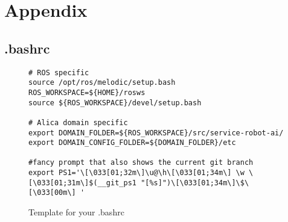 \appendix
\chapter{Appendix}
\label{chap:Appendix}

\begin{landscape}
  \section{.bashrc}
  \label{sec:bashrc}
  \begin{figure}[htbp]
    \begin{verbatim}
# ROS specific 
source /opt/ros/melodic/setup.bash
ROS_WORKSPACE=${HOME}/rosws
source ${ROS_WORKSPACE}/devel/setup.bash

# Alica domain specific
export DOMAIN_FOLDER=${ROS_WORKSPACE}/src/service-robot-ai/
export DOMAIN_CONFIG_FOLDER=${DOMAIN_FOLDER}/etc

#fancy prompt that also shows the current git branch
export PS1='\[\033[01;32m\]\u@\h\[\033[01;34m\] \w \[\033[01;31m\]$(__git_ps1 "[%s]")\[\033[01;34m\]\$\[\033[00m\] '
    \end{verbatim}
    \caption{Template for your .bashrc}
    \label{fig:template_bashrc}
  \end{figure}
\end{landscape}